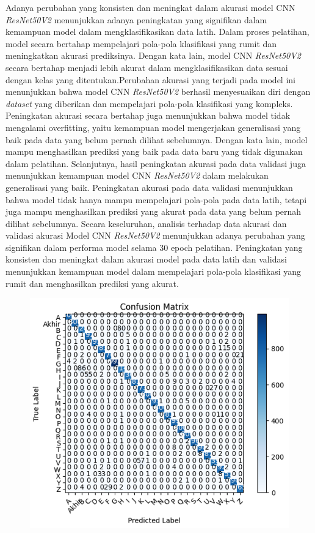 Adanya perubahan yang konsisten dan meningkat dalam akurasi model CNN \textit{ResNet50V2} menunjukkan adanya peningkatan yang signifikan dalam kemampuan model dalam mengklasifikasikan data latih. Dalam proses pelatihan, model secara bertahap mempelajari pola-pola klasifikasi yang rumit dan meningkatkan akurasi prediksinya. Dengan kata lain, model CNN \textit{ResNet50V2} secara bertahap menjadi lebih akurat dalam mengklasifikasikan data sesuai dengan kelas yang ditentukan.Perubahan akurasi yang terjadi pada model ini menunjukkan bahwa model CNN \textit{ResNet50V2} berhasil menyesuaikan diri dengan \textit{dataset} yang diberikan dan mempelajari pola-pola klasifikasi yang kompleks. Peningkatan akurasi secara bertahap juga menunjukkan bahwa model tidak mengalami overfitting, yaitu kemampuan model mengerjakan generalisasi yang baik pada data yang belum pernah dilihat sebelumnya. Dengan kata lain, model mampu menghasilkan prediksi yang baik pada data baru yang tidak digunakan dalam pelatihan. Selanjutnya, hasil peningkatan akurasi pada data validasi juga menunjukkan kemampuan model CNN \textit{ResNet50V2} dalam melakukan generalisasi yang baik. Peningkatan akurasi pada data validasi menunjukkan bahwa model tidak hanya mampu mempelajari pola-pola pada data latih, tetapi juga mampu menghasilkan prediksi yang akurat pada data yang belum pernah dilihat sebelumnya. Secara keseluruhan, analisis terhadap data akurasi dan validasi akurasi Model CNN \textit{ResNet50V2} menunjukkan adanya perubahan yang signifikan dalam performa model selama 30 epoch pelatihan. Peningkatan yang konsisten dan meningkat dalam akurasi model pada data latih dan validasi menunjukkan kemampuan model dalam mempelajari pola-pola klasifikasi yang rumit dan menghasilkan prediksi yang akurat.
\begin{figure}[!hbt]
	\centering
	\includegraphics[width=0.7\linewidth]{gambar/bener/ConfusionMatrix_ModelCNNResNet50V2.png}
	\label{fig:TabelModelCNNResNet50v2}
\end{figure}
